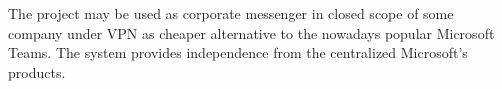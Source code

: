The project may be used as corporate messenger in closed scope of some company under VPN as cheaper alternative to the
nowadays popular Microsoft Teams.
The system provides independence from the centralized Microsoft's products.
